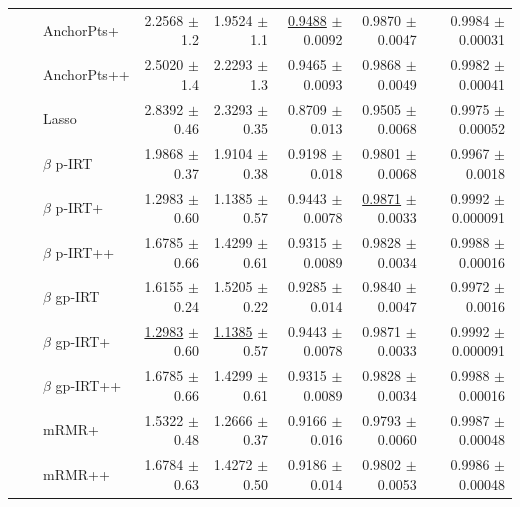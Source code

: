 \begin{longtable}{llp{}rrrrr}
 &  & AnchorPts+ & 2.2568 {\scriptsize $\pm$ 1.2} & 1.9524 {\scriptsize $\pm$ 1.1} & \underline{0.9488} {\scriptsize $\pm$ 0.0092} & 0.9870 {\scriptsize $\pm$ 0.0047} & 0.9984 {\scriptsize $\pm$ 0.00031} \\
 &  & AnchorPts++ & 2.5020 {\scriptsize $\pm$ 1.4} & 2.2293 {\scriptsize $\pm$ 1.3} & 0.9465 {\scriptsize $\pm$ 0.0093} & 0.9868 {\scriptsize $\pm$ 0.0049} & 0.9982 {\scriptsize $\pm$ 0.00041} \\
 &  & Lasso & 2.8392 {\scriptsize $\pm$ 0.46} & 2.3293 {\scriptsize $\pm$ 0.35} & 0.8709 {\scriptsize $\pm$ 0.013} & 0.9505 {\scriptsize $\pm$ 0.0068} & 0.9975 {\scriptsize $\pm$ 0.00052} \\
 &  & $\beta$ p-IRT & 1.9868 {\scriptsize $\pm$ 0.37} & 1.9104 {\scriptsize $\pm$ 0.38} & 0.9198 {\scriptsize $\pm$ 0.018} & 0.9801 {\scriptsize $\pm$ 0.0068} & 0.9967 {\scriptsize $\pm$ 0.0018} \\
 &  & $\beta$ p-IRT+ & 1.2983 {\scriptsize $\pm$ 0.60} & 1.1385 {\scriptsize $\pm$ 0.57} & 0.9443 {\scriptsize $\pm$ 0.0078} & \underline{0.9871} {\scriptsize $\pm$ 0.0033} & 0.9992 {\scriptsize $\pm$ 0.000091} \\
 &  & $\beta$ p-IRT++ & 1.6785 {\scriptsize $\pm$ 0.66} & 1.4299 {\scriptsize $\pm$ 0.61} & 0.9315 {\scriptsize $\pm$ 0.0089} & 0.9828 {\scriptsize $\pm$ 0.0034} & 0.9988 {\scriptsize $\pm$ 0.00016} \\
 &  & $\beta$ gp-IRT & 1.6155 {\scriptsize $\pm$ 0.24} & 1.5205 {\scriptsize $\pm$ 0.22} & 0.9285 {\scriptsize $\pm$ 0.014} & 0.9840 {\scriptsize $\pm$ 0.0047} & 0.9972 {\scriptsize $\pm$ 0.0016} \\
 &  & $\beta$ gp-IRT+ & \underline{1.2983} {\scriptsize $\pm$ 0.60} & \underline{1.1385} {\scriptsize $\pm$ 0.57} & 0.9443 {\scriptsize $\pm$ 0.0078} & 0.9871 {\scriptsize $\pm$ 0.0033} & 0.9992 {\scriptsize $\pm$ 0.000091} \\
 &  & $\beta$ gp-IRT++ & 1.6785 {\scriptsize $\pm$ 0.66} & 1.4299 {\scriptsize $\pm$ 0.61} & 0.9315 {\scriptsize $\pm$ 0.0089} & 0.9828 {\scriptsize $\pm$ 0.0034} & 0.9988 {\scriptsize $\pm$ 0.00016} \\
 &  & mRMR+ & 1.5322 {\scriptsize $\pm$ 0.48} & 1.2666 {\scriptsize $\pm$ 0.37} & 0.9166 {\scriptsize $\pm$ 0.016} & 0.9793 {\scriptsize $\pm$ 0.0060} & 0.9987 {\scriptsize $\pm$ 0.00048} \\
 &  & mRMR++ & 1.6784 {\scriptsize $\pm$ 0.63} & 1.4272 {\scriptsize $\pm$ 0.50} & 0.9186 {\scriptsize $\pm$ 0.014} & 0.9802 {\scriptsize $\pm$ 0.0053} & 0.9986 {\scriptsize $\pm$ 0.00048} \\
\end{longtable}